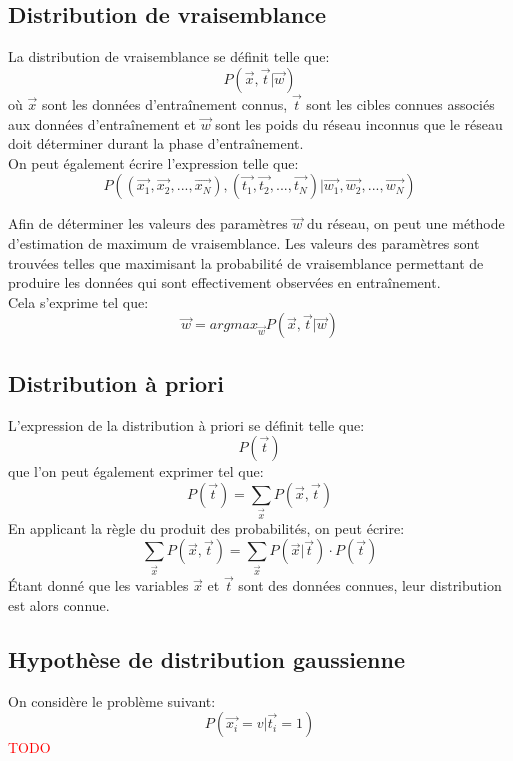 \subsection{Distribution de vraisemblance}
La distribution de vraisemblance se définit telle que: 
$$ P(\overrightarrow{x}, \overrightarrow{t} | \overrightarrow{w}) $$
où $\overrightarrow{x}$ sont les données d'entraînement connus, $\overrightarrow{t}$ sont les cibles connues associés aux données d'entraînement et  $\overrightarrow{w}$ sont les poids du réseau inconnus que le réseau doit déterminer durant la phase d'entraînement. \\
On peut également écrire l'expression telle que:
$$ P((\overrightarrow{x_1}, \overrightarrow{x_2}, ..., \overrightarrow{x_N}), (\overrightarrow{t_1}, \overrightarrow{t_2}, ..., \overrightarrow{t_N}) | \overrightarrow{w_1}, \overrightarrow{w_2}, ..., \overrightarrow{w_N}) $$ 

Afin de déterminer les valeurs des paramètres $\overrightarrow{w}$ du réseau, on peut une méthode d'estimation de maximum de vraisemblance. Les valeurs des paramètres sont trouvées telles que maximisant la probabilité de vraisemblance permettant de produire les données qui sont effectivement observées en entraînement. \\
Cela s'exprime tel que:
$$ \overrightarrow{w} = argmax_{\overrightarrow{w}} P(\overrightarrow{x}, \overrightarrow{t} | \overrightarrow{w}) $$

\subsection{Distribution à priori}
L'expression de la distribution à priori se définit telle que:
$$ P(\overrightarrow{t})  $$
que l'on peut également exprimer tel que:
$$ P(\overrightarrow{t})  = \sum_{\overrightarrow{x}} P(\overrightarrow{x}, \overrightarrow{t}) $$
En applicant la règle du produit des probabilités, on peut écrire:
$$ \sum_{\overrightarrow{x}} P(\overrightarrow{x}, \overrightarrow{t}) =  \sum_{\overrightarrow{x}} P(\overrightarrow{x} | \overrightarrow{t}) \cdot P( \overrightarrow{t})$$
Étant donné que les variables $\overrightarrow{x}$ et $\overrightarrow{t}$ sont des données connues, leur distribution est alors connue. 

\subsection{Hypothèse de distribution gaussienne}
On considère le problème suivant:
$$ P(\overrightarrow{x_i} = v | \overrightarrow{t_i} = 1) $$
\textcolor{red}{TODO}
